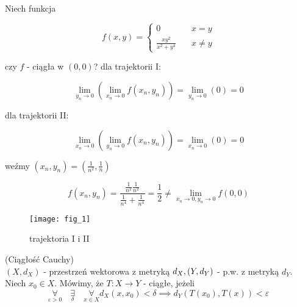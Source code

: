 \documentclass[../main.tex]{subfiles}
\begin{document}
\begin{przyklad}
    Niech funkcja

\[ f(x,y) =
\begin{cases}
    0                           & \quad x=y\\
    \frac{xy^2}{x^2+y^4}  & \quad x\neq y
\end{cases}
\]

czy $f$ - ciągła w $(0,0)$?
dla trajektorii I:

$$\lim\limits_{y_{n}\to 0}(\lim\limits_{x_{n}\rightarrow 0} f(x_{n},y_{n})) = \lim\limits_{y_{n}\rightarrow 0}(0) = 0$$

dla trajektorii II:

$$\lim\limits_{x_{n}\to 0}(\lim\limits_{y_{n}\rightarrow 0} f(x_{n},y_{n})) = \lim\limits_{x_{n}\rightarrow 0}(0) = 0$$

weźmy $(x_{n},y_{n}) = (\frac{1}{n^{2}},\frac{1}{n})$

$$f(x_{n},y_{n}) = \frac{\frac{1}{n^{2}} \frac{1}{n^{2}}}{\frac{1}{n^{4}}+\frac{1}{n^{4}}} = \frac{1}{2} \neq \lim\limits_{x_{n}\to 0, y_{n}\to 0} f(0,0)$$
\end{przyklad}

\begin{figure}
    \centering
    \begin{center}
        \texttt{[image: fig\_1]}
    \end{center}
    \caption{trajektoria I i II}
\end{figure}


\pagebreak
\begin{definicja}
    (Ciągłość Cauchy)\\
$(X,d_{X})$ - przestrzeń wektorowa z metryką $d_{X},\\ (Y,d_{Y})$ - p.w. z metryką $d_{Y}$.\\
Niech $x_{0}\in X$. Mówimy, że $T: X\to Y$ - ciągłe, jeżeli
$$\underset{\varepsilon > 0}{\forall} \quad\underset{\delta}{\exists} \quad\underset{x\in X}{\forall} d_{X} (x,x_{0}) < \delta \implies d_{Y} (T(x_{0}), T(x)) < \varepsilon$$
\end{definicja}
\end{document}
